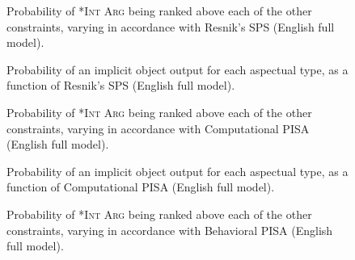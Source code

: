 
\begin{figure}[htb]
\caption{Probability of \textsc{*Int Arg} being ranked above each of the other constraints, varying in accordance with Resnik's SPS (English full model).}
    
\end{figure}

\begin{figure}[htb]
\caption{Probability of an implicit object output for each aspectual type, as a function of Resnik's SPS (English full model).}
    
\end{figure}



\begin{figure}[htb]
\caption{Probability of \textsc{*Int Arg} being ranked above each of the other constraints, varying in accordance with Computational PISA (English full model).}
    
\end{figure}

\begin{figure}[htb]
\caption{Probability of an implicit object output for each aspectual type, as a function of Computational PISA (English full model).}
    
\end{figure}



\begin{figure}[htb]
\caption{Probability of \textsc{*Int Arg} being ranked above each of the other constraints, varying in accordance with Behavioral PISA (English full model).}
    
\end{figure}

